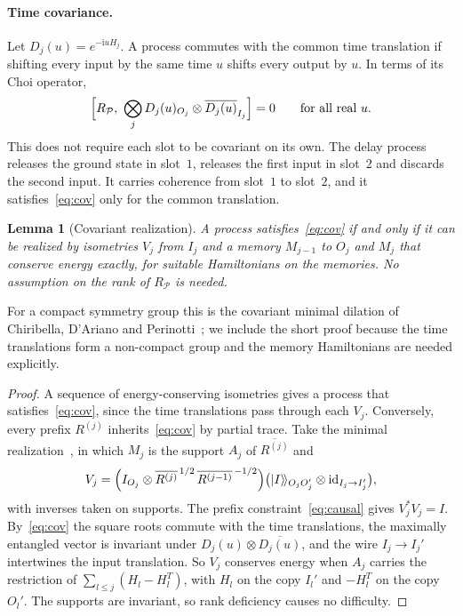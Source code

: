 \documentclass[11pt]{article}
\newtheorem{lemma}[theorem]{Lemma}
\theoremstyle{definition}
\theoremstyle{remark}
\newcommand{\Pp}{\mathcal P}
\begin{document}
\paragraph{Time covariance.} Let $D_j(u)=e^{-\mathrm iuH_j}$. A process commutes with the common time translation if shifting every input by the same time $u$ shifts every output by $u$. In terms of its Choi operator,
\begin{equation}\label{eq:cov}
\Bigl[R_\Pp,\ \bigotimes_j D_j(u)_{O_j}\otimes\overline{D_j(u)}_{I_j}\Bigr]=0\qquad\text{for all real }u.
\end{equation}
This does not require each slot to be covariant on its own. The delay process releases the ground state in slot~$1$, releases the first input in slot~$2$ and discards the second input. It carries coherence from slot~$1$ to slot~$2$, and it satisfies~\eqref{eq:cov} only for the common translation.

\begin{lemma}[Covariant realization]\label{lem:realization}
A process satisfies~\eqref{eq:cov} if and only if it can be realized by isometries $V_j$ from $I_j$ and a memory $M_{j-1}$ to $O_j$ and $M_j$ that conserve energy exactly, for suitable Hamiltonians on the memories. No assumption on the rank of $R_\Pp$ is needed.
\end{lemma}

For a compact symmetry group this is the covariant minimal dilation of Chiribella, D'Ariano and Perinotti~\cite[Eq.~(15)]{CDPcov09}; we include the short proof because the time translations form a non-compact group and the memory Hamiltonians are needed explicitly.

\begin{proof}
A sequence of energy-conserving isometries gives a process that satisfies~\eqref{eq:cov}, since the time translations pass through each $V_j$. Conversely, every prefix $R^{(j)}$ inherits~\eqref{eq:cov} by partial trace. Take the minimal realization~\cite{CDP09}, in which $M_j$ is the support $A_j$ of $\overline{R^{(j)}}$ and
\[
V_j=\Bigl(I_{O_j}\otimes\overline{R^{(j)}}^{\,1/2}\,\overline{R^{(j-1)}}^{\,-1/2}\Bigr)\bigl(|I\rangle\!\rangle_{O_jO_j'}\otimes\mathrm{id}_{I_j\to I_j'}\bigr),
\]
with inverses taken on supports. The prefix constraint~\eqref{eq:causal} gives $V_j^*V_j=I$. By~\eqref{eq:cov} the square roots commute with the time translations, the maximally entangled vector is invariant under $D_j(u)\otimes\overline{D_j(u)}$, and the wire $I_j\to I_j'$ intertwines the input translation. So $V_j$ conserves energy when $A_j$ carries the restriction of $\sum_{l\le j}(H_l-H_l^T)$, with $H_l$ on the copy $I_l'$ and $-H_l^T$ on the copy $O_l'$. The supports are invariant, so rank deficiency causes no difficulty.
\end{proof}
\end{document}

